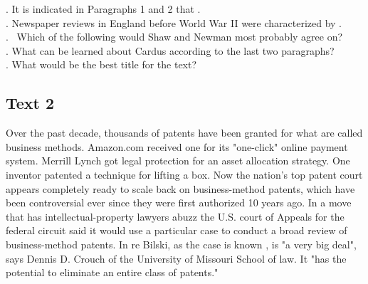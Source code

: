 \begin{questions} . It is indicated in Paragraphs 1 and 2 that .
\\ . Newspaper reviews in England before World War II were characterized by .
\\ .  Which of the following would Shaw and Newman most probably agree on?
\\ . What can be learned about Cardus according to the last two paragraphs?
\\ . What would be the best title for the text?
\\ \end{questions}      \subsection{Text 2}
Over the past decade, thousands of patents have been granted for what are called business methods. Amazon.com received one for its "one-click" online payment system. Merrill Lynch got legal protection for an asset allocation strategy. One inventor patented a technique for lifting a box.
Now the nation's top patent court appears completely ready to scale back on business-method patents, which have been controversial ever since they were first authorized 10 years ago. In a move that has intellectual-property lawyers abuzz the U.S. court of Appeals for the federal circuit said it would use a particular case to conduct a broad review of business-method patents. In re Bilski, as the case is known , is "a very big deal", says Dennis D. Crouch of the University of Missouri School of law. It "has the potential to eliminate an entire class of patents."
